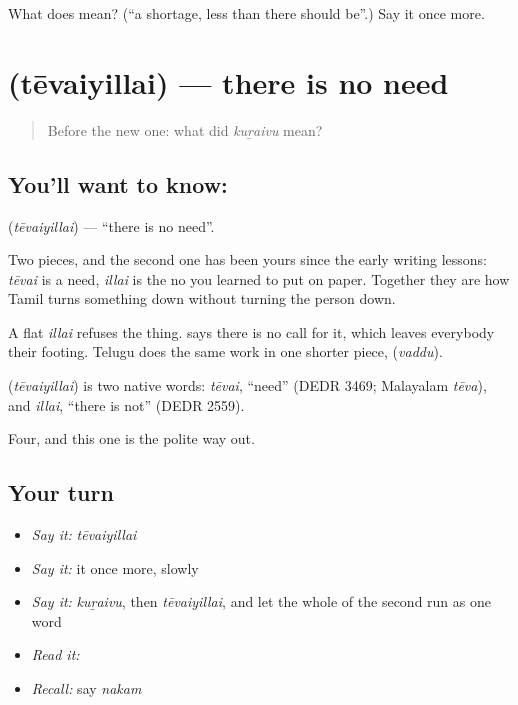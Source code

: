\begin{tcolorbox}[breakable,colback=teal!4,colframe=teal!35!black,title={Before you move on}]
What does  mean? (\textquotedblleft{}a shortage, less than there should be\textquotedblright{}.) Say it once more.
\end{tcolorbox}
\section[\texorpdfstring{\ta{தேவையில்லை} (tēvaiyillai)}{தேவையில்லை (tēvaiyillai)}]{ (tēvaiyillai) — there is no need}

\label{lesson:TA-C56-no-need}



\begin{quote}
Before the new one: what did \emph{kuṟaivu} mean?
\end{quote}

\subsection*{You'll want to know: }
\textbf{} (\emph{tēvaiyillai}) — \textquotedblleft{}there is no need\textquotedblright{}.

Two pieces, and the second one has been yours since the early writing lessons: \emph{tēvai} is a need, \emph{illai} is the no you learned to put on paper. Together they are how Tamil turns something down without turning the person down.

A flat \emph{illai} refuses the thing.  says there is no call for it, which leaves everybody their footing. Telugu does the same work in one shorter piece,  (\emph{vaddu}).

\begin{cousinweb}
\textbf{} (\emph{tēvaiyillai}) is two native words: \emph{tēvai}, \textquotedblleft{}need\textquotedblright{} (DEDR 3469; Malayalam \emph{tēva}), and \emph{illai}, \textquotedblleft{}there is not\textquotedblright{} (DEDR 2559).
\end{cousinweb}

\begin{grammarlens}[title={What you've built}]
Four, and this one is the polite way out.
\end{grammarlens}

\subsection*{Your turn}
\begin{itemize}
\raggedright
  \item \emph{Say it:} \emph{tēvaiyillai}
  \item \emph{Say it:} it once more, slowly
  \item \emph{Say it:} \emph{kuṟaivu}, then \emph{tēvaiyillai}, and let the whole of the second run as one word
  \item \emph{Read it:} \textbf{}
  \item \emph{Recall:} say \emph{nakam}
\end{itemize}

